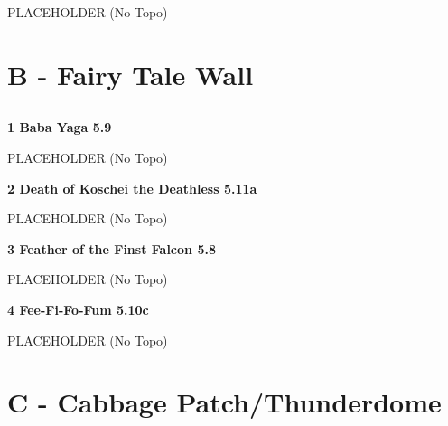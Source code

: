 \begin{multicols}{2}
					\begin{adjustwidth}{0.5cm}{}				
					PLACEHOLDER
						\newline (No Topo) 
					\end{adjustwidth}
\newpage
		\section{B - Fairy Tale Wall}\label{sa:Fairy Tale Wall}
	
	
			\subsection*{}\label{bf:}
						
					\label{rt:Baba Yaga}
\colorbox{green!20}{
\parbox{0.95\linewidth}{
\textbf{
1 Baba Yaga 5.9   
}
}
}

					\begin{adjustwidth}{0.5cm}{}				
					PLACEHOLDER
						\newline (No Topo) 
					\end{adjustwidth}
					\label{rt:Death of Koschei the Deathless}
\colorbox{RoyalBlue!20}{
\parbox{0.95\linewidth}{
\textbf{
2 Death of Koschei the Deathless 5.11a   
}
}
}

					\begin{adjustwidth}{0.5cm}{}				
					PLACEHOLDER
						\newline (No Topo) 
					\end{adjustwidth}
					\label{rt:Feather of the Finst Falcon}
\colorbox{green!20}{
\parbox{0.95\linewidth}{
\textbf{
3 Feather of the Finst Falcon 5.8   
}
}
}

					\begin{adjustwidth}{0.5cm}{}				
					PLACEHOLDER
						\newline (No Topo) 
					\end{adjustwidth}
					\label{rt:Fee-Fi-Fo-Fum}
\colorbox{RoyalBlue!20}{
\parbox{0.95\linewidth}{
\textbf{
4 Fee-Fi-Fo-Fum 5.10c    
}
}
}

					\begin{adjustwidth}{0.5cm}{}				
					PLACEHOLDER
						\newline (No Topo) 
					\end{adjustwidth}
\newpage
		\section{C - Cabbage Patch/Thunderdome}\label{sa:Cabbage Patch/Thunderdome}
	

\end{multicols}
